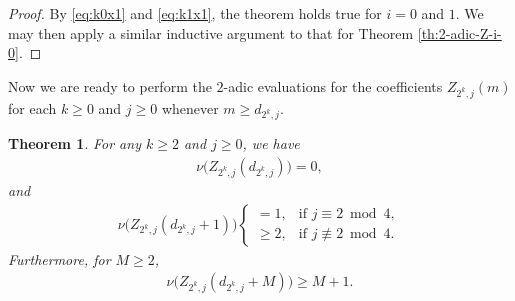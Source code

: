 \documentclass[12pt,reqno]{amsart}
\numberwithin{equation}{section}
\theoremstyle{theorem}
\newtheorem{theorem}{Theorem}
\theoremstyle{definition}
\begin{document}
\begin{proof}
	By \eqref{eq:k0x1} and \eqref{eq:k1x1}, the theorem holds true for $i=0$ and $1$. We may then apply a similar inductive argument to that for Theorem \ref{th:2-adic-Z-i-0}.  
\end{proof}

Now we are ready to perform the $2$-adic evaluations for the coefficients $Z_{2^k,j}(m)$ for each $k\ge 0$ and $j\ge 0$ whenever $m\ge d_{2^k,j}$.

\begin{theorem}\label{th:Z-2-adic}
	For any $k\ge 2$ and $j\ge 0$, we have
	\begin{align*} %
		\nu\big(Z_{2^k,j}(d_{2^k,j})\big) = 0,
	\end{align*}
	and
	\begin{align*} %
		\nu\big(Z_{2^k,j}(d_{2^k,j}+1)\big) \begin{cases}
			= 1, & \text{if $j\equiv 2 \bmod{4}$},\\
			\ge 2, & \text{if $j\not\equiv 2 \bmod{4}$}.
		\end{cases}
	\end{align*}
	Furthermore, for $M\ge 2$,
	\begin{align*} %
		\nu\big(Z_{2^k,j}(d_{2^k,j}+M)\big) \ge M+1.
	\end{align*}
\end{theorem}
\end{document}
